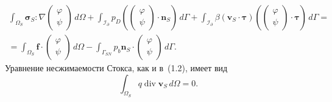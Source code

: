 \documentclass[a4paper,14pt]{extarticle}
\begin{document}
\begin{equation}
	\begin{gathered}
		\int_{\Omega_S}
		\boldsymbol\sigma_S :
		\nabla
		\begin{pmatrix}
			\varphi\\
			\psi
		\end{pmatrix}
		\,d\Omega
		+
		\int_{\mathcal I_\partial}
		p_D
		\left(
			\begin{pmatrix}
				\varphi\\
				\psi
			\end{pmatrix}
			\cdot\mathbf n_S
		\right)
		\,d\Gamma
		+
		\int_{\mathcal I_\partial}
		\beta(\mathbf v_S\cdot\boldsymbol\tau)
		\left(
			\begin{pmatrix}
				\varphi\\
				\psi
			\end{pmatrix}
			\cdot\boldsymbol\tau
		\right)
		\,d\Gamma
		=
		\\[6pt]
		=
		\int_{\Omega_S}
		\mathbf f\cdot
		\begin{pmatrix}
			\varphi\\
			\psi
		\end{pmatrix}
		\,d\Omega
		-
		\int_{\Gamma_{SN}}
		p_b\mathbf n_S\cdot
		\begin{pmatrix}
			\varphi\\
			\psi
		\end{pmatrix}
		\,d\Gamma.
	\end{gathered}
	\label{eq:stokes_coupled_weak}
\end{equation}
Уравнение несжимаемости Стокса, как и в~(1.2), имеет вид
\begin{equation}
	\int_{\Omega_S}
	q\operatorname{div}\mathbf v_S\,d\Omega
	=
	0.
	\label{eq:stokes_coupled_div}
\end{equation}
\end{document}
